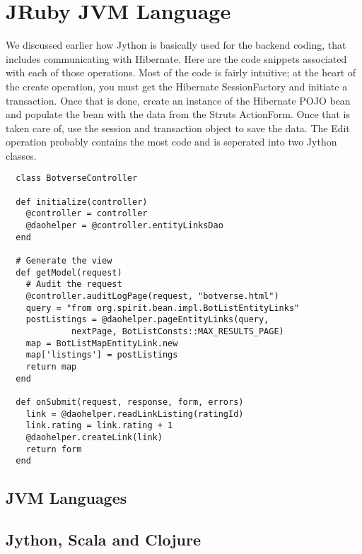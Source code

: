 \section{JRuby JVM Language}

We discussed earlier how Jython is basically used for the backend 
coding, that includes communicating with Hibernate. 
Here are the code snippets associated with each of those operations. 
Most of the code is fairly intuitive; at the heart of the 
create operation, you must get the Hibernate SessionFactory 
and initiate a transaction. Once that is done, 
create an instance of the Hibernate POJO bean and populate 
the bean with the data from the Struts ActionForm. 
Once that is taken care of, use the session and transaction 
object to save the data. The Edit operation probably contains 
the most code and is seperated into two Jython classes.

\begin{verbatim}
  class BotverseController
		
  def initialize(controller)
    @controller = controller
    @daohelper = @controller.entityLinksDao
  end

  # Generate the view
  def getModel(request)  
    # Audit the request
    @controller.auditLogPage(request, "botverse.html")
	query = "from org.spirit.bean.impl.BotListEntityLinks"
	postListings = @daohelper.pageEntityLinks(query, 
	         nextPage, BotListConsts::MAX_RESULTS_PAGE)
	map = BotListMapEntityLink.new    
    map['listings'] = postListings
    return map
  end

  def onSubmit(request, response, form, errors)
    link = @daohelper.readLinkListing(ratingId)    
    link.rating = link.rating + 1
    @daohelper.createLink(link)
    return form
  end

\end{verbatim}

\subsection{JVM Languages}

\subsection{Jython, Scala and Clojure}
